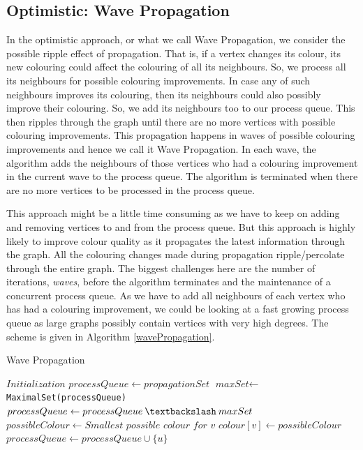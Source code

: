 \documentclass[MTech]{iitmdiss}
\begin{document}
\subsection{Optimistic: Wave Propagation}
In the optimistic approach, or what we call Wave Propagation, we consider the possible ripple effect of propagation. That is, if a vertex changes its colour, its new colouring could affect the colouring of all its neighbours. So, we process all its neighbours for possible colouring improvements. In case any of such neighbours improves its colouring, then its neighbours could also possibly improve their colouring. So, we add its neighbours too to our process queue. This then ripples through the graph until there are no more vertices with possible colouring improvements. This propagation happens in waves of possible colouring improvements and hence we call it Wave Propagation. In each wave, the algorithm adds the neighbours of those vertices who had a colouring improvement in the current wave to the process queue. The algorithm is terminated when there are no more vertices to be processed in the process queue.

This approach might be a little time consuming as we have to keep on adding and removing vertices to and from the process queue. But this approach is highly likely to improve colour quality as it propagates the latest information through the graph. All the colouring changes made during propagation ripple/percolate through the entire graph.  The biggest challenges here are the number of iterations, \textit{waves}, before the algorithm terminates and the maintenance of a concurrent process queue. As we have to add all neighbours of each vertex who has had a colouring improvement, we could be looking at a fast growing process queue as large graphs possibly contain vertices with very high degrees. The scheme is given in Algorithm \ref{wavePropagation}. 

\begin{algorithm}
\caption{Wave Propagation}\label{wavePropagation}
\begin{algorithmic}[1]
\State $\textit{Initialization}$
\State $\textit{processQueue} \gets propagationSet$
\State $\textit{maxSet} \gets $\verb+MaximalSet(processQueue)+
\State $processQueue \gets processQueue \: \textbackslash \: maxSet$
\State $possibleColour \gets \textit{Smallest possible colour for v}$
\State $colour[v] \gets possibleColour$
\State $processQueue \gets processQueue \cup \{u\}$
\EndFor
\EndIf
\EndFor
\EndWhile
\EndProcedure
\end{algorithmic}
\end{algorithm}
\end{document}
